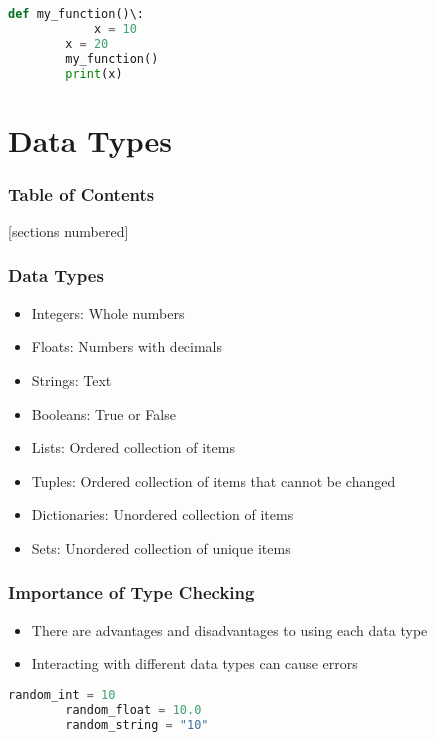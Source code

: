 \documentclass[serif, 9pt, aspectratio=32]{beamer}
\begin{document}
\begin{frame}[fragile]
    \begin{lstlisting}[language=Python]
        def my_function()\:
            x = 10
        x = 20
        my_function()
        print(x)
    \end{lstlisting}
\end{frame}

\section{Data Types}

\begin{frame}
    \frametitle{Table of Contents}
    [sections numbered]
    \tableofcontents[currentsection]
\end{frame}

\begin{frame}
    \centering
    \frametitle{Data Types}
    \begin{itemize}
        \setlength{\itemsep}{1em}
        \item Integers: Whole numbers
        \item Floats: Numbers with decimals
        \item Strings: Text
        \item Booleans: True or False
        \item Lists: Ordered collection of items
        \item Tuples: Ordered collection of items that cannot be changed
        \item Dictionaries: Unordered collection of items
        \item Sets: Unordered collection of unique items
    \end{itemize}
\end{frame}

\begin{frame}
    \centering
    \frametitle{Importance of Type Checking}
    \begin{itemize}
        \setlength{\itemsep}{3em}
        \item There are advantages and disadvantages to using each data type
        \item Interacting with different data types can cause errors
    \end{itemize}
\end{frame}

\begin{frame}[fragile]
    \begin{lstlisting}[language=Python]
        random_int = 10
        random_float = 10.0
        random_string = "10"
    \end{lstlisting}
\end{frame}
\end{document}
